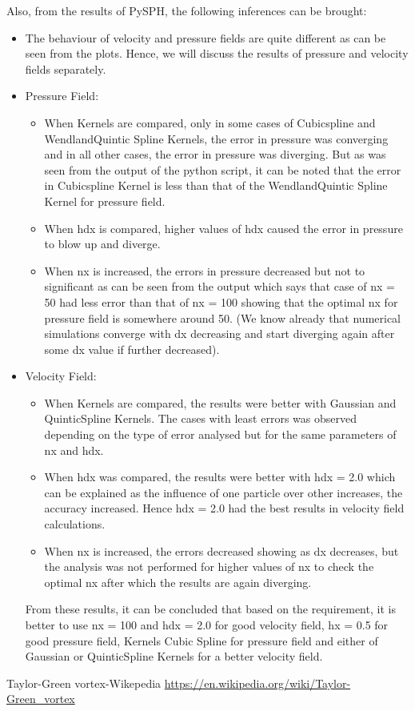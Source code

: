\documentclass[11pt, a4paper]{article}
\begin{document}
Also, from the results of PySPH, the following inferences can be brought:
\begin{itemize}
 \item The behaviour of velocity and pressure fields are quite different as can be seen from the plots. Hence, we will discuss the results of pressure and velocity fields separately.
 \item Pressure Field:
 \begin{itemize}
  \item When Kernels are compared, only in some cases of Cubicspline and WendlandQuintic Spline Kernels, the error in pressure was converging and in all other cases, the error in pressure was diverging. But as was seen from the output of the python script, it can be noted that the error in Cubicspline Kernel is less than that of the WendlandQuintic Spline Kernel for pressure field.
  \item When hdx is compared, higher values of hdx caused the error in pressure to blow up and diverge.
  \item When nx is increased, the errors in pressure decreased but not to significant as can be seen from the output which says that case of nx = 50 had less error than that of nx = 100 showing that the optimal nx for pressure field is somewhere around 50. (We know already that numerical simulations converge with dx decreasing and start diverging again after some dx value if further decreased).
 \end{itemize}
 \item Velocity Field:
 \begin{itemize}
  \item When Kernels are compared, the results were better with Gaussian and QuinticSpline Kernels. The cases with least errors was observed depending on the type of error analysed but for the same parameters of nx and hdx.
  \item When hdx was compared, the results were better with hdx = 2.0 which can be explained as the influence of one particle over other increases, the accuracy increased. Hence hdx = 2.0 had the best results in velocity field calculations.
  \item When nx is increased, the errors decreased showing as dx decreases, but the analysis was not performed for higher values of nx to check the optimal nx after which the results are again diverging.
 \end{itemize}
 
 From these results, it can be concluded that based on the requirement, it is better to use nx = 100 and hdx = 2.0 for good velocity field, hx = 0.5 for good pressure field, Kernels Cubic Spline for pressure field and either of Gaussian or QuinticSpline Kernels for a better velocity field.

\end{itemize}


\begin{thebibliography}{1}
  Taylor-Green vortex-Wikepedia \url{https://en.wikipedia.org/wiki/Taylor-Green_vortex}
\end{thebibliography}
\end{document}
